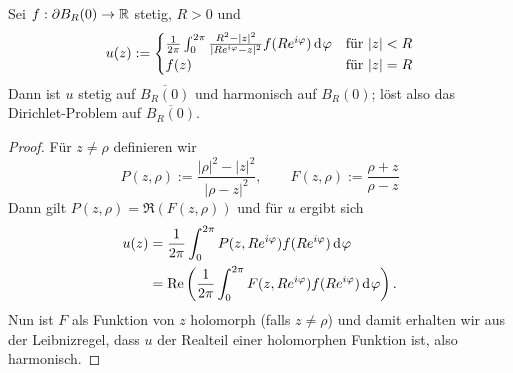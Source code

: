 \begin{thm}
  \label{thm:poisson}
  Sei $f: \partial B_R(0) \rightarrow \mathbb{R}$ stetig, $R > 0$ und
\begin{align*}
    u(z) :=
    \begin{cases}
      \frac{1}{2\pi} \int_0^{2\pi} \frac{R^2 - |z|^2}{|Re^{i\phi}
        - z|^2} f(R e^{i\phi}) \d[\phi] & \text{für } |z| < R\\
      f(z) & \text{für } |z| = R
    \end{cases}
  \end{align*}
  Dann ist $u$ stetig auf $\overline{B_R(0)}$ und harmonisch auf $B_R(0)$;
  löst also das Dirichlet-Problem auf $\overline{B_R(0)}$.
\end{thm}

\begin{proof}
  Für $z \neq \rho$ definieren wir
  \[
  P(z, \rho) := \frac{|\rho|^2 - |z|^2}{|\rho - z|^2}, \qquad
  F(z,\rho) := \frac{\rho +z }{\rho - z}
  \]
  Dann gilt $P(z, \rho) = \Re(F(z, \rho))$ und für $u$ ergibt sich
  \begin{align*}
    u(z) & = \frac{1}{2\pi} \int_0^{2\pi} P(z, Re^{i\phi})
    f(Re^{i\phi}) \d[\phi] \\
    & = \Re \left ( \frac{1}{2\pi} \int_0^{2\pi} F(z, Re^{i\phi})
      f(Re^{i\phi}) \d[\phi] \right ).
  \end{align*}
  Nun ist $F$ als Funktion von $z$ holomorph (falls $z \neq \rho$)
  und damit erhalten wir aus der Leibnizregel, dass $u$ der Realteil
  einer holomorphen Funktion ist, also harmonisch.
  

\end{proof}
